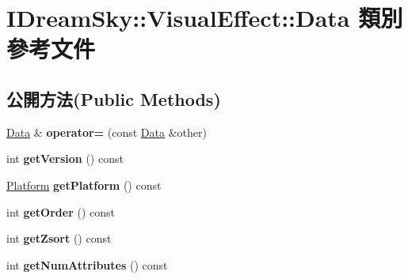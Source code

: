 \hypertarget{class_i_dream_sky_1_1_visual_effect_1_1_data}{}\section{I\+Dream\+Sky\+:\+:Visual\+Effect\+:\+:Data 類別 參考文件}
\label{class_i_dream_sky_1_1_visual_effect_1_1_data}
\subsection*{公開方法(Public Methods)}
\begin{DoxyCompactItemize}
\item 
\hyperlink{class_i_dream_sky_1_1_visual_effect_1_1_data}{Data} \& {\bfseries operator=} (const \hyperlink{class_i_dream_sky_1_1_visual_effect_1_1_data}{Data} \&other)\hypertarget{class_i_dream_sky_1_1_visual_effect_1_1_data_af3d138454e94cb1adb72c30f2e3cef0b}{}\label{class_i_dream_sky_1_1_visual_effect_1_1_data_af3d138454e94cb1adb72c30f2e3cef0b}

\item 
int {\bfseries get\+Version} () const \hypertarget{class_i_dream_sky_1_1_visual_effect_1_1_data_ae05ce8435c5a81dcbd5275ad9945d715}{}\label{class_i_dream_sky_1_1_visual_effect_1_1_data_ae05ce8435c5a81dcbd5275ad9945d715}

\item 
\hyperlink{class_i_dream_sky_1_1_platform}{Platform} {\bfseries get\+Platform} () const \hypertarget{class_i_dream_sky_1_1_visual_effect_1_1_data_aef807952caa8612212a9102771bcf017}{}\label{class_i_dream_sky_1_1_visual_effect_1_1_data_aef807952caa8612212a9102771bcf017}

\item 
int {\bfseries get\+Order} () const \hypertarget{class_i_dream_sky_1_1_visual_effect_1_1_data_a72870398ac9c09fb19c5cd0fb415e675}{}\label{class_i_dream_sky_1_1_visual_effect_1_1_data_a72870398ac9c09fb19c5cd0fb415e675}

\item 
int {\bfseries get\+Zsort} () const \hypertarget{class_i_dream_sky_1_1_visual_effect_1_1_data_a62575ddeeac625823e27ac692490b5b3}{}\label{class_i_dream_sky_1_1_visual_effect_1_1_data_a62575ddeeac625823e27ac692490b5b3}

\item 
int {\bfseries get\+Num\+Attributes} () const \hypertarget{class_i_dream_sky_1_1_visual_effect_1_1_data_aad4610b6b23245b1e9d53a8c31890547}{}\label{class_i_dream_sky_1_1_visual_effect_1_1_data_aad4610b6b23245b1e9d53a8c31890547}


\end{DoxyCompactItemize}
